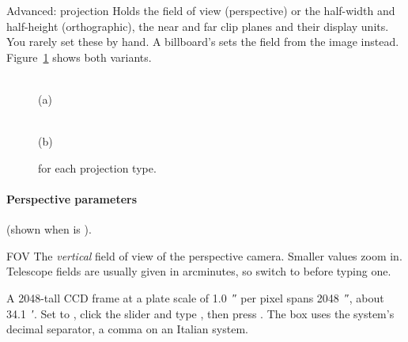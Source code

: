 \begin{uipanel}
\begin{uiproperty}[key=advanced, id=ProjectionAdvancedExpander, type={expander},
    default={collapsed}, help=Tabs_Settings_HelpViewProjectionAdvanced]{Advanced: projection}
Holds the field of view (perspective) or the half-width and half-height (orthographic), the
near and far clip planes and their display units. You rarely set these by hand. A billboard's
 sets the field from the image instead.
Figure~\ref{fig:settings-viewport-projection} shows both variants.
\end{uiproperty}

\begin{figure}[htbp]
  \centering
  \begin{minipage}[b]{0.48\linewidth}\centering
    \\
    \small (a) 
  \end{minipage}\hfill
  \begin{minipage}[b]{0.48\linewidth}\centering
    \\
    \small (b) 
  \end{minipage}
  \caption{ for each projection type.}
  \label{fig:settings-viewport-projection}
\end{figure}

\paragraph{Perspective parameters} (shown when  is ).

\begin{uiproperty}[key=fov, id=FovSlider, type={slider (drag, or click and type)},
    unit={the one chosen in \uilabel{Units}: \unit{\degree}, \unit{\arcminute} or
      \unit{\arcsecond}},
    range={\qty{0.02}{\arcsecond} to \qty{179}{\degree}; step \qty{1}{\degree},
      \qty{1}{\arcminute} or \qty{10}{\arcsecond}},
    default={\qty{30}{\degree}}, %
    effect=camera, saved=file, visible={Perspective; disabled while locked},
    help=Tabs_Settings_HelpViewFov]{FOV}
The \emph{vertical} field of view of the perspective camera. Smaller values zoom in.
Telescope fields are usually given in arcminutes, so switch  to
 before typing one.
\begin{uiexample}
A \qty{2048}{\pixel}-tall CCD frame at a plate scale of \qty{1.0}{\arcsecond} per pixel
spans \qty{2048}{\arcsecond}, about \qty{34.1}{\arcminute}. Set  to
, click the slider and type , then press
. The box uses the system's decimal separator, a comma on an Italian system.
\end{uiexample}
\end{uiproperty}


\end{uipanel}
